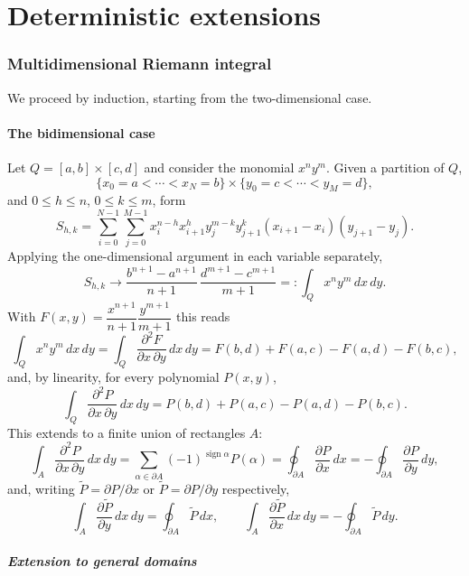 \documentclass[11pt,fleqn]{article}
\theoremstyle{plain}
\theoremstyle{remark}
\begin{document}
\part{Deterministic extensions}

\section{Multidimensional Riemann integral}

We proceed by induction, starting from the two-dimensional case.

\subsection{The bidimensional case}

Let $Q=[a,b]\times[c,d]$ and consider the monomial $x^ny^m$. Given a
partition of $Q$,
\[
\{x_0=a<\cdots<x_N=b\}\times\{y_0=c<\cdots<y_M=d\},
\]
and $0\le h\le n$, $0\le k\le m$, form
\[
S_{h,k}=\sum_{i=0}^{N-1}\sum_{j=0}^{M-1}
x_i^{n-h}x_{i+1}^hy_j^{m-k}y_{j+1}^k(x_{i+1}-x_i)(y_{j+1}-y_j).
\]
Applying the one-dimensional argument in each variable separately,
\[
S_{h,k}\longrightarrow\frac{b^{n+1}-a^{n+1}}{n+1}\,\frac{d^{m+1}-c^{m+1}}{m+1}
=:\int_Qx^ny^m\,dx\,dy.
\]
With $F(x,y)=\dfrac{x^{n+1}}{n+1}\dfrac{y^{m+1}}{m+1}$ this reads
\[
\int_Qx^ny^m\,dx\,dy=\int_Q\frac{\partial^2F}{\partial x\,\partial y}\,dx\,dy
=F(b,d)+F(a,c)-F(a,d)-F(b,c),
\]
and, by linearity, for every polynomial $P(x,y)$,
\[
\int_Q\frac{\partial^2P}{\partial x\,\partial y}\,dx\,dy
=P(b,d)+P(a,c)-P(a,d)-P(b,c).
\]
This extends to a finite union of rectangles $A$:
\[
\int_A\frac{\partial^2P}{\partial x\,\partial y}\,dx\,dy
=\sum_{\alpha\in\partial A}(-1)^{\operatorname{sign}\alpha}P(\alpha)
=\oint_{\partial A}\frac{\partial P}{\partial x}\,dx
=-\oint_{\partial A}\frac{\partial P}{\partial y}\,dy,
\]
and, writing $\tilde P=\partial P/\partial x$ or $\tilde P=\partial P/\partial y$ respectively,
\[
\int_A\frac{\partial\tilde P}{\partial y}\,dx\,dy=\oint_{\partial A}\tilde P\,dx,
\qquad
\int_A\frac{\partial\tilde P}{\partial x}\,dx\,dy=-\oint_{\partial A}\tilde P\,dy.
\]

\subsubsection*{Extension to general domains}
\end{document}
